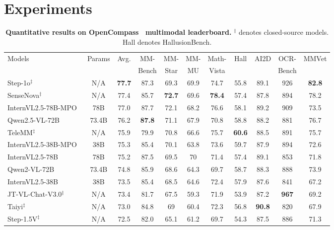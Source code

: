 \section{Experiments}\label{sec:exp}

\begin{table}[t]
\centering
\caption{\textbf{Quantitative results on OpenCompass~\cite{2023opencompass} multimodal leaderboard.}
$^{\ddag}$ denotes closed-source models. Hall denotes HallusionBench.
}
\label{tab:exp_it_oc}
\setlength{\tabcolsep}{1pt}
\begin{tabular}{l|c|c|cccccccc}
\toprule
Models   & Params & Avg. & MM- & MM- & MM- & Math- & Hall & AI2D  & OCR- & MMVet \\
   &  &  & Bench & Star & MU & Vista &  &  & Bench & \\
\midrule
Step-1o$^{\ddag}$   & N/A   & \textbf{77.7}  & 87.3  & 69.3  & 69.9 & 74.7  & 55.8 & 89.1 & 926 & \textbf{82.8}  \\
SenseNova$^{\ddag}$  & N/A   & 77.4  & 85.7  & \textbf{72.7}  & 69.6 & \textbf{78.4}  & 57.4 & 87.8 & 894 & 78.2  \\
InternVL2.5-78B-MPO~\cite{wang2024mpo}  & 78B  & 77.0   & 87.7  & 72.1  & 68.2  & 76.6  & 58.1  & 89.2 & 909 & 73.5  \\
Qwen2.5-VL-72B~\cite{bai2025qwen25vltechnicalreport}   & 73.4B  & 76.2  & \textbf{87.8}  & 71.1  & 67.9  & 70.8  & 58.8  & 88.2  & 881  & 76.7  \\
TeleMM$^{\ddag}$   & N/A   & 75.9  & 79.9 & 70.8 & 66.6 & 75.7  & \textbf{60.6}  & 88.5 & 891 & 75.7  \\
InternVL2.5-38B-MPO~\cite{wang2024mpo}  & 38B  & 75.3  & 85.4  & 70.1 & 63.8 & 73.6 & 59.7 & 87.9 & 894 & 72.6  \\
InternVL2.5-78B~\cite{chen2024expanding}  & 78B  & 75.2 & 87.5  & 69.5 & 70 & 71.4 & 57.4 & 89.1 & 853 & 71.8   \\
Qwen2-VL-72B~\cite{qwen2-vl_2024}   & 73.4B  & 74.8  & 85.9  & 68.6  & 64.3  & 69.7  & 58.7  & 88.3  & 888  & 73.9  \\
InternVL2.5-38B~\cite{chen2024expanding}  & 38B  & 73.5  & 85.4  & 68.5  & 64.6  & 72.4  & 57.9  & 87.6  & 841  & 67.2  \\
JT-VL-Chat-V3.0$^{\ddag}$  & N/A   & 73.4  & 81.7  & 67.5  & 59.3  & 71.9  & 53.9  & 87.2  & \textbf{967}  & 69.2  \\
Taiyi$^{\ddag}$  & N/A   & 73.0  & 84.8  & 69  & 60.4  & 72.3  & 56.8  & \textbf{90.8}  & 820  & 67.9  \\
Step-1.5V$^{\ddag}$  & N/A   & 72.5 & 82.0  & 65.1  & 61.2  & 69.7  & 54.3  & 87.5  & 886  & 71.3  \\

\end{tabular}
\end{table}
